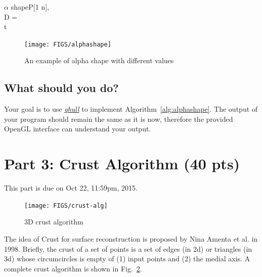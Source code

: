 \documentclass[11pt]{article}
\begin{document}
{\small
	\begin{pseudocode}[shadowbox]{$\alpha$ shape}{P[1 \cdots n], \alpha}
	\label{alg:alphashape}
	\\
	D =  \\
	 \DO
	\BEGIN
	\IF {}  \DO
		 t
	\END
	\end{pseudocode}
}


\begin{figure}[h]
\centering
\texttt{[image: FIGS/alphashape]}
\caption{An example of alpha shape with different values}
\label{alg:alpha}
\end{figure}




\subsection{What should  you do?}

Your goal is to use \href{http://www.qhull.org/}{\it qhull} to implement Algorithm~\ref{alg:alphashape}.
The output of your program should remain the same as it is now, therefore
the provided OpenGL interface can understand your output.




\section{Part 3: Crust Algorithm (40 pts)}

This part is due on Oct 22, 11:59pm, 2015.


\begin{figure}[ht]
\centering
\texttt{[image: FIGS/crust-alg]}
\caption{3D crust algorithm}
\label{alg:crust-alg}
\end{figure}

The idea of Crust for surface reconstruction is proposed by Nina Amenta et al. \cite{abk-anvra-98} in 1998.
Briefly, the crust of a set of points is a set of edges (in 2d) or triangles (in 3d) whose circumcircles is empty of
(1) input points and (2) the medial axis.  A complete crust algorithm is shown in Fig.~\ref{alg:crust-alg}.
\end{document}
